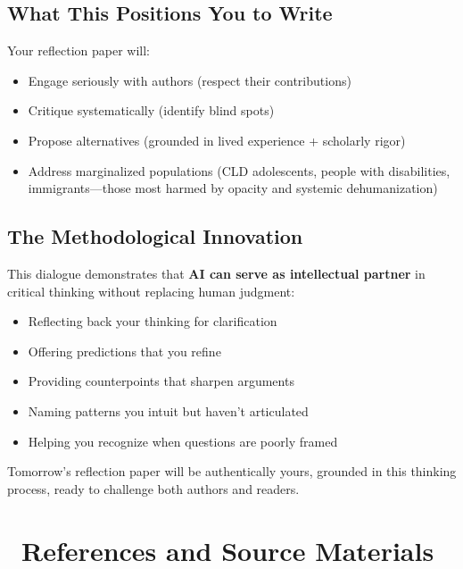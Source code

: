 \documentclass[12pt,letterpaper]{article}
\begin{document}
\subsection{What This Positions You to Write}

Your reflection paper will:

\begin{itemize}[leftmargin=*]
    \item Engage seriously with authors (respect their contributions)
    \item Critique systematically (identify blind spots)
    \item Propose alternatives (grounded in lived experience + scholarly rigor)
    \item Address marginalized populations (CLD adolescents, people with disabilities, immigrants---those most harmed by opacity and systemic dehumanization)
\end{itemize}

\subsection{The Methodological Innovation}

\begin{puzzleplan}
This dialogue demonstrates that \textbf{AI can serve as intellectual partner} in critical thinking without replacing human judgment:
\begin{itemize}[leftmargin=*,noitemsep,font=\small]
    \item Reflecting back your thinking for clarification
    \item Offering predictions that you refine
    \item Providing counterpoints that sharpen arguments
    \item Naming patterns you intuit but haven't articulated
    \item Helping you recognize when questions are poorly framed
\end{itemize}

Tomorrow's reflection paper will be authentically yours, grounded in this thinking process, ready to challenge both authors and readers.
\end{puzzleplan}

\newpage

\section*{\faBook\ References and Source Materials}
\end{document}
